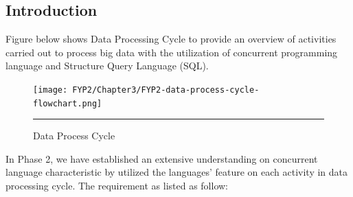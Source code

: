 \subsection{Introduction}

Figure below shows Data Processing Cycle to provide an overview of activities carried out to process big data with the utilization of concurrent programming language and Structure Query Language (SQL).

\begin{figure}[H]
	\centering
	\texttt{[image: FYP2/Chapter3/FYP2-data-process-cycle-flowchart.png]}
	\rule{35em}{0.5pt}
	\caption[Data Process Cycle]{Data Process Cycle}
\end{figure} 

In Phase 2, we have established an extensive understanding on concurrent language characteristic by utilized the languages' feature on each activity in data processing cycle. The requirement as listed as follow: 

